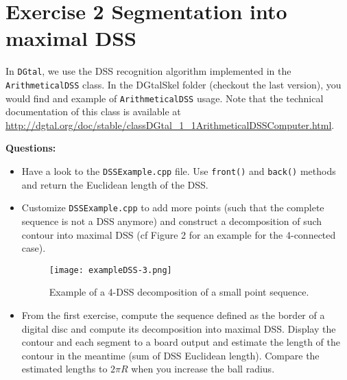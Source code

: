 \documentclass[a4paper, 11pt]{article}
\begin{document}
\section*{Exercise 2 \rm Segmentation into maximal DSS}

\par In \texttt{DGtal}, we use the DSS recognition algorithm implemented in the \texttt{ArithmeticalDSS} class. In the DGtalSkel folder (checkout the last version), you would find and example of \texttt{ArithmeticalDSS} usage. Note that the technical documentation of this class is available at \url{http://dgtal.org/doc/stable/classDGtal_1_1ArithmeticalDSSComputer.html}.

{\bf Questions:}
\begin{itemize}
	\item Have a look to the \texttt{DSSExample.cpp} file. Use \texttt{front()} and \texttt{back()} methods and return the Euclidean length of the DSS.
	\item  Customize \texttt{DSSExample.cpp} to add more points (such that the complete sequence is not a DSS anymore) and construct a decomposition of such contour into maximal DSS (cf Figure 2 for an example for the 4-connected case).
	\begin{figure}[h]
	\centering
	\texttt{[image: exampleDSS-3.png]}
	\caption{Example of a 4-DSS decomposition of a small point sequence.}
	\end{figure}

	\item From the first exercise, compute the sequence defined as the border of a digital disc and compute its decomposition into maximal DSS. Display the contour and each segment to a board output and estimate the length of the contour in the meantime (sum of DSS Euclidean length).  Compare the estimated lengths to $2\pi R$ when you increase the ball radius.
\end{itemize}
\end{document}
